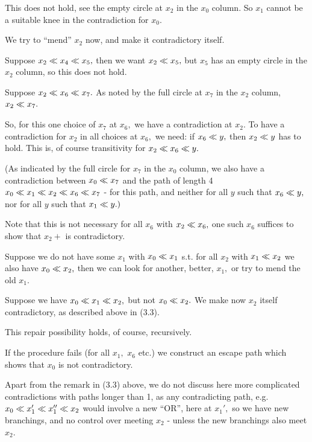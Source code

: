 This does not hold, see the empty circle at $x_{2}$ in the $x_{0}$ column.
So $x_{1}$ cannot be a suitable knee in the contradiction for $x_{0}.$

 \xDH
We try to ``mend'' $x_{2}$ now, and make it contradictory itself.

Suppose $x_{2} \ll x_{4} \ll x_{5},$ then we want $x_{2} \ll x_{5},$
but $x_{5}$ has an empty circle in
the $x_{2}$ column, so this does not hold.

Suppose $x_{2} \ll x_{6} \ll x_{7}.$ As noted by the full circle at
$x_{7}$ in the $x_{2}$ column,
$x_{2} \ll x_{7}.$

So, for this one choice of $x_{7}$ at $x_{6},$ we have a contradiction at
$x_{2}.$
To have a contradiction for $x_{2}$ in all choices at $x_{6},$ we need: if
$x_{6} \ll y,$ then $x_{2} \ll y$ has to hold.
This is, of course transitivity for $x_{2} \ll x_{6} \ll y.$

(As indicated by the full circle for $x_{7}$ in the $x_{0}$ column, we
also
have a contradiction between $x_{0} \ll x_{7}$ and the path of length 4
$x_{0} \ll x_{1} \ll x_{2} \ll x_{6} \ll x_{7}$ - for this path, and
neither for all $y$ such that
$x_{6} \ll y,$ nor for all $y$ such that $x_{1} \ll y.)$

Note that this is not necessary for all $x_{6}$ with $x_{2} \ll x_{6},$
one such $x_{6}$ suffices
to show that $x_{2}+$ is contradictory.

 \xDH
Suppose we do not have some $x_{1}$ with $x_{0} \ll x_{1}$ s.t. for all
$x_{2}$ with $x_{1} \ll x_{2}$
we also have $x_{0} \ll x_{2},$ then we can look for another, better,
$x_{1},$ or try
to mend the old $x_{1}.$

Suppose we have $x_{0} \ll x_{1} \ll x_{2},$ but not $x_{0} \ll x_{2}.$
We make now $x_{2}$ itself contradictory,
as described above in (3.3).

This repair possibility holds, of course, recursively.

If the procedure fails (for all $x_{1},$ $x_{6}$ etc.) we construct an
escape path
which shows that $x_{0}$ is not contradictory.

 \xDH
Apart from the remark in (3.3) above,
we do not discuss here more complicated contradictions
with paths longer than 1, as any contradicting path, e.g. $x_{0} \ll
x_{1}' \ll x_{1}'' \ll x_{2}$
would involve a new ``OR'', here at $x_{1}',$ so we have new branchings,
and no control over meeting $x_{2}$ - unless the new branchings also meet
$x_{2}.$

